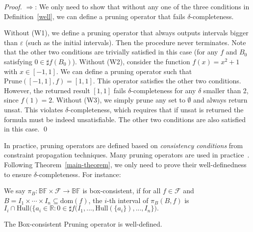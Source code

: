 \documentclass[envcountsect]{llncs}
\newcommand{\dom}{\mathrm{dom}}
\begin{document}
\begin{proof}
$\Rightarrow$: We only need to show that without any one of the three conditions in Definition~\ref{well}, we can define a pruning operator that fails $\delta$-completeness. 

Without (W1), we define a pruning operator that always outputs intervals bigger than $\varepsilon$ (such as the initial intervals). Then the procedure never terminates. Note that the other two conditions are trivially satisfied in this case (for any $f$ and $B_0$ satisfying $0\in \sharp f(B_0)$). Without (W2), consider the function $f(x)=x^2+1$ with $x\in [-1,1]$. We can define a pruning operator such that $\mathrm{Prune}([-1,1],f) = [1,1]$. This operator satisfies the other two conditions. However, the returned result $[1,1]$ fails $\delta$-completeness for any $\delta$ smaller than 2, since $f(1) = 2$. Without (W3), we simply prune any set to $\emptyset$ and always return {\sf unsat}. This violates $\delta$-completeness, which requires that if {\sf unsat} is returned the formula must be indeed unsatisfiable. The other two conditions are also satisfied in this case.  
\qed
\end{proof}

In practice, pruning operators are defined based on {\em consistency conditions} from constraint propagation techniques. Many pruning operators are used in practice~\cite{handbookICP}. Following Theorem~\ref{main-theorem}, we only need to prove their well-definedness to ensure $\delta$-completeness. For instance:
\begin{definition}
We say $\pi_B: \mathbb{BF}\times\mathcal{F}\rightarrow \mathbb{BF}$ is box-consistent, if for all $f\in \mathcal{F}$ and $B= I_1\times \cdots \times I_n \subseteq \dom(f)$, the $i$-th interval of $\pi_B(B,f)$ is $I_i\cap \mathrm{Hull}\big(\{a_i\in \mathbb{R}: 0\in \sharp f(I_1,...,\mathrm{Hull}(\{a_i\}),..., I_n\}\big).$
\end{definition}
\begin{proposition}
The Box-consistent Pruning operator is well-defined.
\end{proposition}
\end{document}
